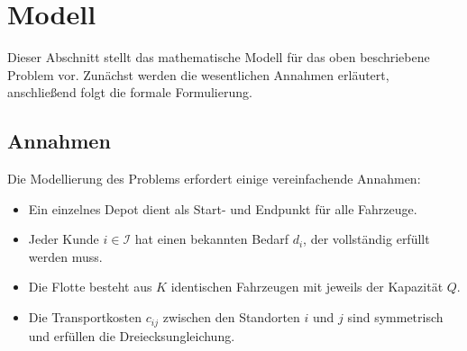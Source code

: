\documentclass[11pt,a4paper]{article}
\begin{document}
\section{Modell}
\label{sec:modell}
Dieser Abschnitt stellt das mathematische Modell für das oben beschriebene Problem vor. Zunächst werden die wesentlichen Annahmen erläutert, anschließend folgt die formale Formulierung.

\subsection{Annahmen}
\label{sec:annahmen}
Die Modellierung des Problems erfordert einige vereinfachende Annahmen:
\begin{itemize}
	\item Ein einzelnes Depot dient als Start- und Endpunkt für alle Fahrzeuge.
	\item Jeder Kunde $i \in \mathcal{I}$ hat einen bekannten Bedarf $d_i$, der vollständig erfüllt werden muss.
	\item Die Flotte besteht aus $K$ identischen Fahrzeugen mit jeweils der Kapazität $Q$.
	\item Die Transportkosten $c_{ij}$ zwischen den Standorten $i$ und $j$ sind symmetrisch und erfüllen die Dreiecksungleichung.
\end{itemize}

%
\end{document}

